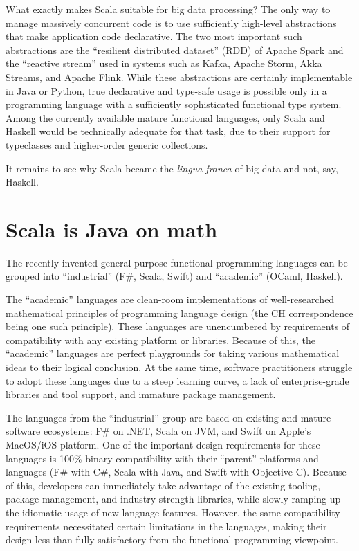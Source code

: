 What exactly makes Scala suitable for big data processing? The only
way to manage massively concurrent code is to use sufficiently high-level
abstractions that make application code declarative. The two most
important such abstractions are the ``resilient distributed dataset''
(RDD) of Apache Spark and the ``reactive stream'' used in systems
such as Kafka, Apache Storm, Akka Streams, and Apache Flink. While
these abstractions are certainly implementable in Java or Python,
true declarative and type-safe usage is possible only in a programming
language with a sufficiently sophisticated functional type system.
Among the currently available mature functional languages, only Scala
and Haskell would be technically adequate for that task, due to their
support for typeclasses and higher-order generic collections.

It remains to see why Scala became the \emph{lingua franca} of big
data and not, say, Haskell.

\section{Scala is Java on math }

The recently invented general-purpose functional programming languages
can be grouped into ``industrial'' (F\#, Scala, Swift) and ``academic''
(OCaml, Haskell).

The ``academic'' languages are clean-room implementations of well-researched
mathematical principles of programming language design (the CH correspondence
being one such principle). These languages are unencumbered by requirements
of compatibility with any existing platform or libraries. Because
of this, the ``academic'' languages are perfect playgrounds for
taking various mathematical ideas to their logical conclusion. At
the same time, software practitioners struggle to adopt these languages
due to a steep learning curve, a lack of enterprise-grade libraries
and tool support, and immature package management.

The languages from the ``industrial'' group are based on existing
and mature software ecosystems: F\# on .NET, Scala on JVM, and Swift
on Apple's MacOS/iOS platform. One of the important design requirements
for these languages is 100\% binary compatibility with their ``parent''
platforms and languages (F\# with C\#, Scala with Java, and Swift
with Objective-C). Because of this, developers can immediately take
advantage of the existing tooling, package management, and industry-strength
libraries, while slowly ramping up the idiomatic usage of new language
features. However, the same compatibility requirements necessitated
certain limitations in the languages, making their design less than
fully satisfactory from the functional programming viewpoint.

